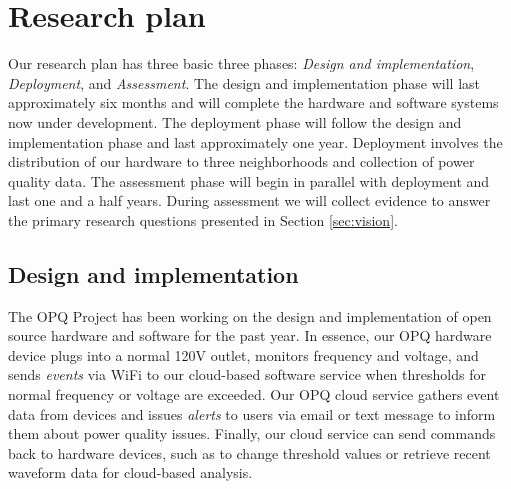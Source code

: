 
\section{Research plan}


Our research plan has three basic three phases: {\em Design and implementation}, {\em Deployment}, and {\em Assessment}.  The design and implementation phase will last approximately six months and will complete the hardware and software systems now under development. The deployment phase will follow the design and implementation phase and last approximately one year. Deployment involves the distribution of our hardware to three neighborhoods and collection of power quality data.  The assessment phase will begin in parallel with deployment and last one and a half years. During assessment we will collect evidence to answer the primary research questions presented in Section \ref{sec:vision}.

\subsection{Design and implementation}

The OPQ Project has been working on the design and implementation of open source hardware and software for the past year. In essence, our OPQ hardware device plugs into a normal 120V outlet, monitors frequency and voltage, and sends {\em events} via WiFi to our cloud-based software service when thresholds for normal frequency or voltage are exceeded.  Our OPQ cloud service gathers event data from devices and issues {\em alerts} to users via email or text message to inform them about power quality issues. Finally, our cloud service can send commands back to hardware devices, such as to change threshold values or retrieve recent waveform data for cloud-based analysis.

